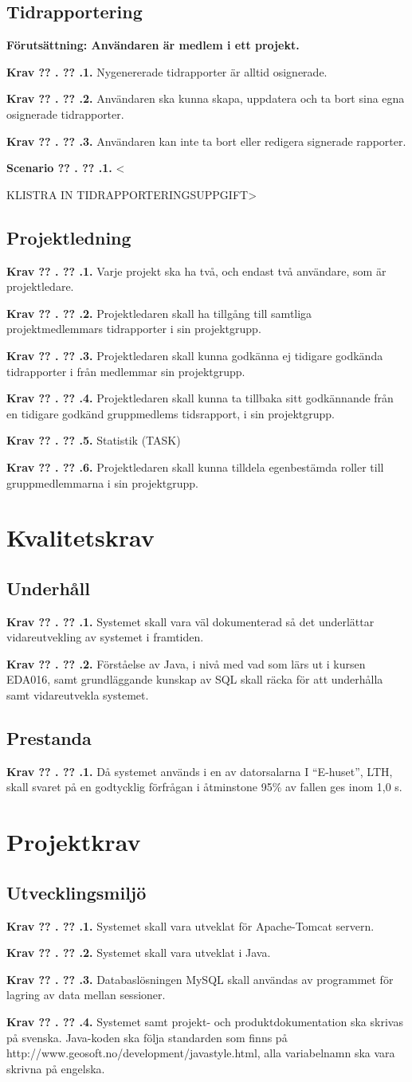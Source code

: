 \documentclass[a4paper]{article}
\newcommand\getcurrentref[1]{%
 \ifnumequal{\value{#1}}{0}
  {??}
  {\the\value{#1}}%
}
\newcommand\requirement[2]{
	\numberedrow{Krav}{#1}{#2}
}
\newcommand\scenario[2] {
	\numberedrow{Scenario}{#1}{#2}
}
\newcommand\numberedrow[3]{
	\noindent
	\textbf{#1 \getcurrentref{section}.\getcurrentref{subsection}.#2.} #3
	
}
\begin{document}
\subsection{Tidrapportering}
\textbf{Förutsättning: Användaren är medlem i ett projekt.}\newline
\requirement{1}{Nygenererade tidrapporter är alltid osignerade.}
\requirement{2}{Användaren ska kunna skapa, uppdatera och ta bort sina egna osignerade tidrapporter.}
\requirement{3}{Användaren kan inte ta bort eller redigera signerade rapporter.}
\scenario{1} <KLISTRA IN TIDRAPPORTERINGSUPPGIFT>
\subsection{Projektledning}
\requirement{1}{Varje projekt ska ha två, och endast två användare, som är projektledare.}
\requirement{2}{Projektledaren skall ha tillgång till samtliga projektmedlemmars tidrapporter i sin projektgrupp.}
\requirement{3}{Projektledaren skall kunna godkänna ej tidigare godkända tidrapporter i från medlemmar sin projektgrupp.}
\requirement{4}{Projektledaren skall kunna ta tillbaka sitt godkännande från en tidigare godkänd gruppmedlems tidsrapport, i sin projektgrupp.}
\requirement{5}{Statistik (TASK)}
\requirement{6}{Projektledaren skall kunna tilldela egenbestämda roller till gruppmedlemmarna i sin projektgrupp.}

\section{Kvalitetskrav}
\subsection{Underhåll}
\requirement{1}{Systemet skall vara väl dokumenterad så det underlättar vidareutvekling av systemet i framtiden.}
\requirement{2}{Förståelse av Java, i nivå med vad som lärs ut i kursen EDA016, samt grundläggande kunskap av SQL skall räcka för att underhålla samt vidareutvekla systemet.}
\subsection{Prestanda}
\requirement{1}{Då systemet används i en av datorsalarna I “E-huset”, LTH, skall svaret på en godtycklig förfrågan i åtminstone 95\% av fallen ges inom 1,0 s.}
\section{Projektkrav}
\subsection{Utvecklingsmiljö}
\requirement{1}{Systemet skall vara utveklat för Apache-Tomcat servern.}
\requirement{2}{Systemet skall vara utveklat i Java.}
\requirement{3}{Databaslösningen MySQL skall användas av programmet för lagring av data mellan sessioner.}
\requirement{4}{Systemet samt projekt- och produktdokumentation ska skrivas på svenska. Java-koden ska följa standarden som finns på http://www.geosoft.no/development/javastyle.html, alla variabelnamn ska vara skrivna på engelska.}
\end{document}
